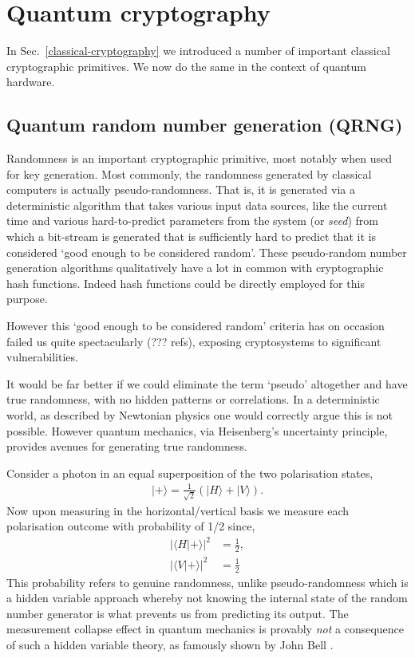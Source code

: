 \section{Quantum cryptography} \label{quantum-cryptography}

In Sec.~\ref{classical-cryptography} we introduced a number of important classical cryptographic primitives. We now do the same in the context of quantum hardware.

\subsection{Quantum random number generation (QRNG)} \label{quantum-random-number-generation-qrng}

Randomness is an important cryptographic primitive, most notably when used for key generation. Most commonly, the randomness generated by classical computers is actually pseudo-randomness. That is, it is generated via a deterministic algorithm that takes various input data sources, like the current time and various hard-to-predict parameters from the system (or \emph{seed}) from which a bit-stream is generated that is sufficiently hard to predict that it is considered `good enough to be considered random'. These pseudo-random number generation algorithms qualitatively have a lot in common with cryptographic hash functions. Indeed hash functions could be directly employed for this purpose.

However this `good enough to be considered random' criteria has on occasion failed us quite spectacularly (??? refs), exposing cryptosystems to significant vulnerabilities.

It would be far better if we could eliminate the term `pseudo' altogether and have true randomness, with no hidden patterns or correlations. In a deterministic world, as described by Newtonian physics one would correctly argue this is not possible. However quantum mechanics, via Heisenberg's uncertainty principle, provides avenues for generating true randomness.

Consider a photon in an equal superposition of the two polarisation states,
\begin{align}
	|+\rangle=\frac{1}{\sqrt{2}}(|H\rangle+|V\rangle).
\end{align}
Now upon measuring in the horizontal/vertical basis we measure each polarisation outcome with probability of 1/2 since,
\begin{align}
	|\langle H|+\rangle|^2 &= \frac{1}{2},\nonumber\\
	|\langle V|+\rangle|^2 &= \frac{1}{2}
\end{align}
This probability refers to genuine randomness, unlike pseudo-randomness which is a hidden variable approach whereby not knowing the internal state of the random number generator is what prevents us from predicting its output. The measurement collapse effect in quantum mechanics is provably \emph{not} a consequence of such a hidden variable theory, as famously shown by John Bell \cite{bib:bells-theorem}.

